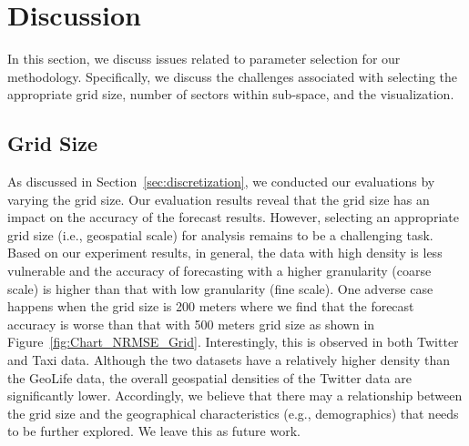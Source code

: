 \section{Discussion}

In this section, we discuss issues related to parameter selection for our methodology. %
Specifically, we discuss the challenges associated with selecting the appropriate grid size, number of sectors within sub-space, and the visualization.


\subsection{Grid Size}

As discussed in Section~\ref{sec:discretization}, we conducted our evaluations by varying the grid size.
Our evaluation results reveal that the grid size has an impact on the accuracy of the forecast results.
However, selecting an appropriate grid size (i.e., geospatial scale) for analysis remains to be a challenging task.
%
Based on our experiment results, in general, the data with high density is less vulnerable and the accuracy of forecasting with a higher granularity (coarse scale) is higher than that with low granularity (fine scale). 
One adverse case happens when the grid size is 200 meters where we find that the forecast accuracy is worse than that with 500 meters grid size as shown in Figure~\ref{fig:Chart_NRMSE_Grid}.
Interestingly, this is observed in both Twitter and Taxi data.
Although the two datasets have a relatively higher density than the GeoLife data, the overall geospatial densities of the Twitter data are significantly lower.
Accordingly, we believe that there may a relationship between the grid size and the geographical characteristics (e.g., demographics) that needs to be further explored.
We leave this as future work.

